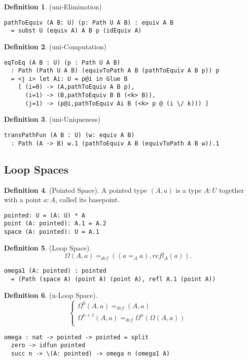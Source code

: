 \documentclass{article}
\theoremstyle{definition}
\newtheorem{definition}{Definition}
\begin{document}
\begin{definition} (uni-Elimination)
\begin{lstlisting}
pathToEquiv (A B: U) (p: Path U A B) : equiv A B
  = subst U (equiv A) A B p (idEquiv A)
\end{lstlisting}
\end{definition}

\begin{definition} (uni-Computation)
\begin{lstlisting}
eqToEq (A B : U) (p : Path U A B)
  : Path (Path U A B) (equivToPath A B (pathToEquiv A B p)) p
  = <j i> let Ai: U = p@i in Glue B
    [ (i=0) -> (A,pathToEquiv A B p),
      (i=1) -> (B,pathToEquiv B B (<k> B)),
      (j=1) -> (p@i,pathToEquiv Ai B (<k> p @ (i \/ k))) ]

\end{lstlisting}
\end{definition}

\begin{definition} (uni-Uniqueness)
\begin{lstlisting}
transPathFun (A B : U) (w: equiv A B)
  : Path (A -> B) w.1 (pathToEquiv A B (equivToPath A B w)).1
\end{lstlisting}
\end{definition}

\newpage
\subsection{Loop Spaces}

\begin{definition} (Pointed Space). A pointed type $(A,a)$ is a type $A:U$
together with a point $a:A$, called its basepoint.
\begin{lstlisting}
pointed: U = (A: U) * A
point (A: pointed): A.1 = A.2
space (A: pointed): U = A.1
\end{lstlisting}
\end{definition}

\begin{definition} (Loop Space).
$$\Omega(A,a) =_{def} ((a =_A a), refl_A(a)).$$
\begin{lstlisting}
omega1 (A: pointed) : pointed
  = (Path (space A) (point A) (point A), refl A.1 (point A))
\end{lstlisting}
\end{definition}

\begin{definition} (n-Loop Space).
$$
\begin{cases}
\Omega^0(A, a) =_{def} (A, a)\\
\Omega^{n+1}(A,a) =_{def} \Omega^{n}(\Omega(A,a))\\
\end{cases}
$$
\begin{lstlisting}
omega : nat -> pointed -> pointed = split
  zero -> idfun pointed
  succ n -> \(A: pointed) -> omega n (omega1 A)
\end{lstlisting}
\end{definition}
\end{document}
